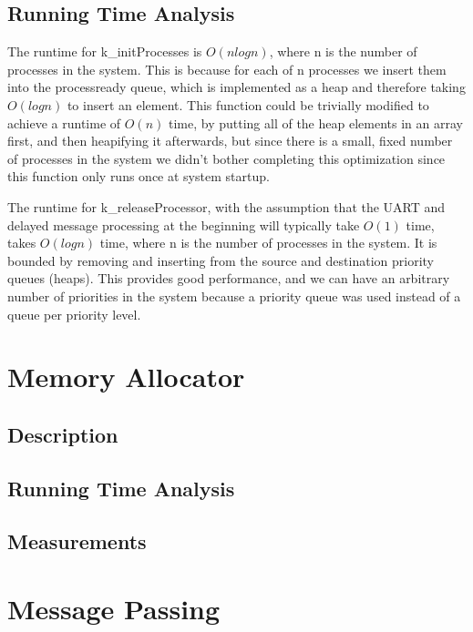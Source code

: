 \documentclass[12pt]{report}
\begin{document}
\section{Running Time Analysis}
The runtime for k\_initProcesses is $O(nlogn)$, where n is the number of processes in the system. This is because for each of n processes we insert them into the process\-ready queue, which is implemented as a heap and therefore taking $O(logn)$ to insert an element. This function could be trivially modified to achieve a runtime of $O(n)$ time, by putting all of the heap elements in an array first, and then heapifying it afterwards, but since there is a small, fixed number of processes in the system we didn't bother completing this optimization since this function only runs once at system startup.

The runtime for k\_releaseProcessor, with the assumption that the UART and delayed message processing at the beginning will typically take $O(1)$ time, takes $O(log n)$ time, where n is the number of processes in the system. It is bounded by removing and inserting from the source and destination priority queues (heaps). This provides good performance, and we can have an arbitrary number of priorities in the system because a priority queue was used instead of a queue per priority level.

\chapter{Memory Allocator}

\section{Description}

\section{Running Time Analysis}

\section{Measurements}

\chapter{Message Passing}
\end{document}
